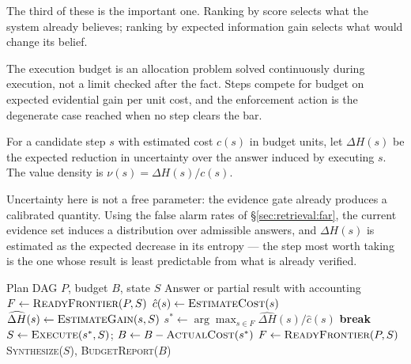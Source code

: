The third of these is the important one. Ranking by score selects what the system already believes; ranking by expected information gain selects what would change its belief.

\begin{designprinciple}
The execution budget is an allocation problem solved continuously during execution, not a limit checked after the fact. Steps compete for budget on expected evidential gain per unit cost, and the enforcement action is the degenerate case reached when no step clears the bar.
\end{designprinciple}

\begin{definition}
\label{def:value-density}
For a candidate step $s$ with estimated cost $c(s)$ in budget units, let $\Delta H(s)$ be the expected reduction in uncertainty over the answer induced by executing $s$. The value density is $\nu(s) = \Delta H(s) / c(s)$.
\end{definition}

Uncertainty here is not a free parameter: the evidence gate already produces a calibrated quantity. Using the false alarm rates of \S\ref{sec:retrieval:far}, the current evidence set induces a distribution over admissible answers, and $\Delta H(s)$ is estimated as the expected decrease in its entropy --- the step most worth taking is the one whose result is least predictable from what is already verified.

\begin{algorithm}[H]
\caption{Budget-Aware Step Scheduling}
\label{alg:budget-scheduling}
\begin{algorithmic}[1]
\Require Plan DAG $P$, budget $B$, state $S$
\Ensure Answer or partial result with accounting
\State $F \gets \textsc{ReadyFrontier}(P, S)$ 
    \State $\hat{c}(s) \gets \textsc{EstimateCost}(s)$ 
    \State $\widehat{\Delta H}(s) \gets \textsc{EstimateGain}(s, S)$ 
  \EndFor
  \State $s^* \gets \arg\max_{s \in F} \widehat{\Delta H}(s) / \hat{c}(s)$
    \State \textbf{break} 
  \EndIf
  \State $S \gets \textsc{Execute}(s^*, S)$; $B \gets B - \textsc{ActualCost}(s^*)$
  \State $F \gets \textsc{ReadyFrontier}(P, S)$ 
\EndWhile
\State \Return \textsc{Synthesize}($S$), \textsc{BudgetReport}($B$)
\end{algorithmic}
\end{algorithm}

